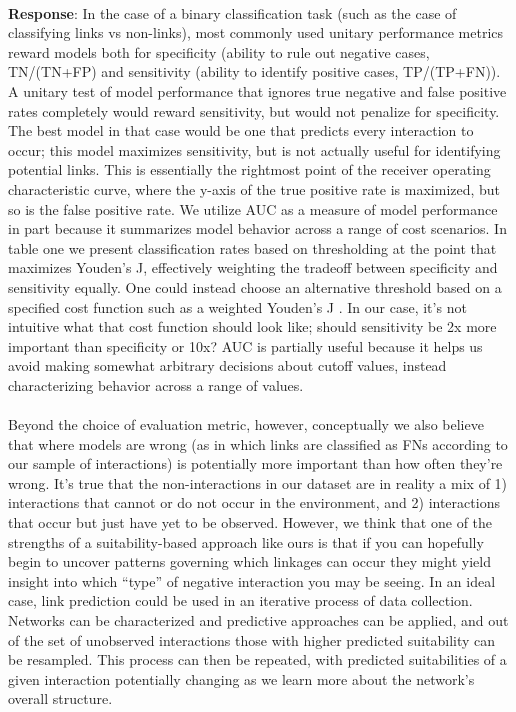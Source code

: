 \documentclass{article}
\begin{document}
    \paragraph*{}\textbf{Response}: In the case of a binary classification task (such as the case of classifying links vs non-links), most commonly used unitary performance metrics reward models both for specificity (ability to rule out negative cases, TN/(TN+FP) and sensitivity (ability to identify positive cases, TP/(TP+FN)). A unitary test of model performance that ignores true negative and false positive rates completely would reward sensitivity, but would not penalize for specificity. The best model in that case would be one that predicts every interaction to occur; this model maximizes sensitivity, but is not actually useful for identifying potential links. This is essentially the rightmost point of the receiver operating characteristic curve, where the y-axis of the true positive rate is maximized, but so is the false positive rate. We utilize AUC as a measure of model performance in part because it summarizes model behavior across a range of cost scenarios. In table one we present classification rates based on thresholding at the point that maximizes Youden’s J, effectively weighting the tradeoff between specificity and sensitivity equally. One could instead choose an alternative threshold based on a specified cost function such as a weighted Youden’s J \citep{rucker2010summary}. In our case, it’s not intuitive what that cost function should look like; should sensitivity be 2x more important than specificity or 10x? AUC is partially useful because it helps us avoid making somewhat arbitrary decisions about cutoff values, instead characterizing behavior across a range of values.
   \paragraph*{}Beyond the choice of evaluation metric, however, conceptually we also believe that where models are wrong (as in which links are classified as FNs according to our sample of interactions) is potentially more important than how often they’re wrong. It’s true that the non-interactions in our dataset are in reality a mix of 1) interactions that cannot or do not occur in the environment, and 2) interactions that occur but just have yet to be observed. However, we think that one of the strengths of a suitability-based approach like ours is that if you can hopefully begin to uncover patterns governing which linkages can occur they might yield insight into which “type” of negative interaction you may be seeing. In an ideal case, link prediction could be used in an iterative process of data collection. Networks can be characterized and predictive approaches can be applied, and out of the set of unobserved interactions those with higher predicted suitability can be resampled. This process can then be repeated, with predicted suitabilities of a given interaction potentially changing as we learn more about the network’s overall structure. 
\end{document}
